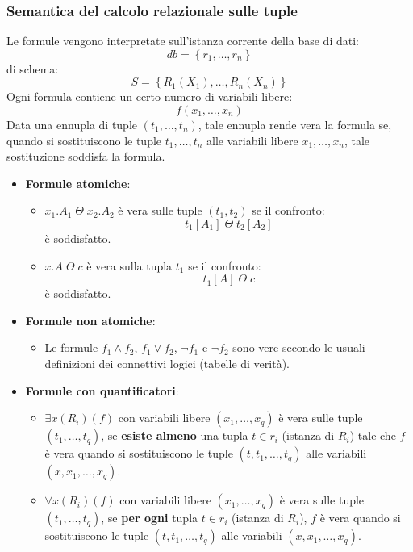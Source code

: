 \documentclass[a4paper,twoside]{article}
\begin{document}
\subsubsection{Semantica del calcolo relazionale sulle tuple}
Le formule vengono interpretate sull'istanza corrente della base di dati:
\[
  db = \left\{ r_1, \ldots, r_n \right\}
\] 
di schema:
\[
  S = \left\{ R_1(X_1), \ldots, R_n(X_n) \right\}
\]
Ogni formula contiene un certo numero di variabili libere:
\[
  f(x_1, \ldots, x_n)
\] 
Data una ennupla di tuple \( (t_1, \ldots, t_n) \), tale ennupla rende vera la formula
se, quando si sostituiscono le tuple \( t_1, \ldots, t_n \) alle variabili libere
\( x_1, \ldots, x_n \), tale sostituzione soddisfa la formula.
\begin{itemize}
  \item \textbf{Formule atomiche}:
    \begin{itemize}
      \item \( x_1.A_1 \;\Theta\; x_2.A_2 \) è vera sulle tuple \( (t_1, t_2) \) se il
        confronto:
        \[
          t_1[A_1] \;\Theta\; t_2[A_2]
        \] 
        è soddisfatto.

      \item \( x.A \;\Theta\; c \) è vera sulla tupla \( t_1 \) se il confronto:
        \[
          t_1[A] \;\Theta\; c
        \] 
        è soddisfatto.
    \end{itemize}

  \item \textbf{Formule non atomiche}:
    \begin{itemize}
      \item Le formule \( f_1 \land f_2 \), \( f_1 \lor f_2 \), \( \lnot f_1 \) e
        \( \lnot f_2 \) sono vere secondo le usuali definizioni dei connettivi logici
        (tabelle di verità).
    \end{itemize}

  \item \textbf{Formule con quantificatori}:
    \begin{itemize}
      \item \( \exists x (R_i)(f) \) con variabili libere \( (x_1, \ldots, x_q) \) è vera
        sulle tuple \( (t_1, \ldots, t_q) \), se \textbf{esiste almeno} una tupla
        \( t \in r_i \) (istanza di \( R_i \)) tale che \( f \) è vera quando si
        sostituiscono le tuple \( (t, t_1, \ldots, t_q) \) alle variabili
        \( (x, x_1, \ldots, x_q) \).

      \item \( \forall x (R_i)(f) \) con variabili libere \( (x_1, \ldots, x_q) \) è vera
        sulle tuple \( (t_1, \ldots, t_q) \), se \textbf{per ogni} tupla
        \( t \in r_i \) (istanza di \( R_i \)), \( f \) è vera quando si
        sostituiscono le tuple \( (t, t_1, \ldots, t_q) \) alle variabili
        \( (x, x_1, \ldots, x_q) \).
    \end{itemize}
\end{itemize}
\end{document}
